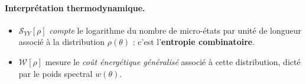 


\paragraph{Interprétation thermodynamique.}
\label{chap4:sec:TBA}

\begin{itemize}[label = $\bullet$] 
\item $\mathcal{S}_{YY}[\rho]$ \emph{compte} le logarithme du nombre de
      micro-états par unité de longueur associé à la distribution $\rho(\theta)$ :
      c’est l’\textbf{entropie combinatoire}.
\item $\mathcal{W}[\rho]$ mesure le \emph{coût énergétique généralisé}
      associé à cette distribution, dicté par le poids spectral $w(\theta)$.
\end{itemize}

